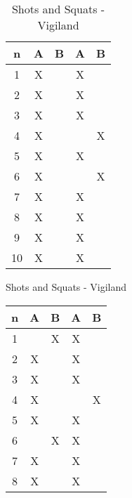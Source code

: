 \begin{figure}[H]
\centering
\begin{subfigure}[t]{0.45\textwidth}
\begin{table}[H]
\centering
\begin{tabular}{ccccc}
n        & A       & B       & A       & B      \\ \bottomrule 
1        & X       &         & X       &        \\
2        & X       &         & X       &        \\
3        & X       &         & X       &        \\
4        & X       &         &         & X      \\
5        & X       &         & X       &        \\ \hline
6        & X       &         &         & X      \\
7        & X       &         & X       &        \\
8        & X       &         & X       &        \\
9        & X       &         & X       &        \\
10       & X       &         & X       &        \\ \bottomrule 
\end{tabular}
\caption{Shots and Squats - Vigiland}
\label{tab:shotsandsquats}
\end{table}
\end{subfigure}
\begin{subfigure}[t]{0.45\textwidth}
\begin{table}[H]
\centering
\begin{tabular}{ccccc}
n         & A        & B        & A       & B       \\ \bottomrule 
1         &          & X        & X       &         \\
2         & X        &          & X       &         \\
3         & X        &          & X       &         \\
4         & X        &          &         & X       \\
5         & X        &          & X       &         \\ \hline
6         &          & X        & X       &         \\
7         & X        &          & X       &         \\
8         & X        &          & X       &         \\

\end{tabular}
\end{table}
\end{subfigure}
\end{figure}

